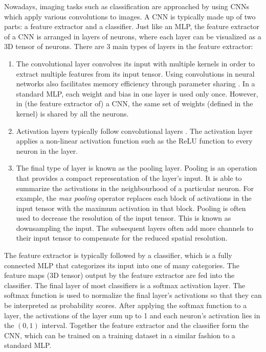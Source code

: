 Nowadays, imaging tasks such as classification are approached by using CNNs which apply various convolutions to images. A CNN is typically made up of two parts: a feature extractor and a classifier. Just like an MLP, the feature extractor of a CNN is arranged in layers of neurons, where each layer can be visualized as a 3D tensor of neurons. There are 3 main types of layers in the feature extractor:
\begin{enumerate}
    \item The convolutional layer convolves its input with multiple kernels in order to extract multiple features from its input tensor. Using convolutions in neural networks also facilitates memory efficiency through parameter sharing \parencite{goodfellow2016deep}. In a standard MLP, each weight and bias in one layer is used only once. However, in (the feature extractor of) a CNN, the same set of weights (defined in the kernel) is shared by all the neurons.
    \item Activation layers typically follow convolutional layers \parencite{hesamian2019deep}. The activation layer applies a non-linear activation function such as the ReLU function to every neuron in the layer.
    \item The final type of layer is known as the pooling layer. Pooling is an operation that provides a compact representation of the layer's input. It is able to summarize the activations in the neighbourhood of a particular neuron. For example, the \emph{max pooling} operator replaces each block of activations in the input tensor with the maximum activation in that block. Pooling is often used to decrease the resolution of the input tensor. This is known as downsampling the input. The subsequent layers often add more channels to their input tensor to compensate for the reduced spatial resolution.
\end{enumerate}

The feature extractor is typically followed by a classifier, which is a fully connected MLP that categorizes its input into one of many categories. The feature maps (3D tensor) output by the feature extractor are fed into the classifier. The final layer of most classifiers is a softmax activation layer. The softmax function is used to normalize the final layer's activations so that they can be interpreted as probability scores. After applying the softmax function to a layer, the activations of the layer sum up to 1 and each neuron's activation lies in the $(0,1)$ interval. Together the feature extractor and the classifier form the CNN, which can be trained on a training dataset in a similar fashion to a standard MLP.

